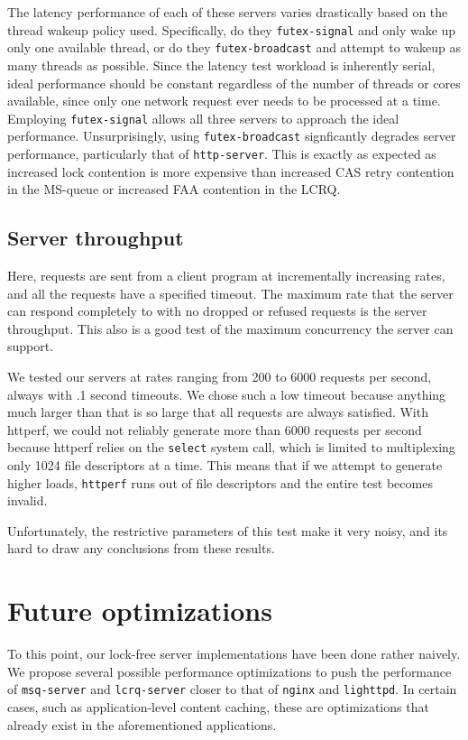 \documentclass[twoside,10pt]{article}
\begin{document}
\begin{multicols}{2}
The latency performance of each of these servers varies drastically based on
the thread wakeup policy used. Specifically, do they \verb+futex-signal+ and 
only wake up only one available thread, or do they \verb+futex-broadcast+ and attempt to wakeup as many threads as possible. Since the latency test workload
is inherently serial, ideal performance should be constant regardless of the 
number of threads or cores available, since only one network request ever needs
to be processed at a time. Employing \verb+futex-signal+ allows all three 
servers to approach the ideal performance. Unsurprisingly, using \verb+futex-broadcast+ signficantly degrades server performance, particularly that of 
\verb+http-server+. This is exactly as expected as increased lock contention 
is more expensive than increased CAS retry contention in the MS-queue or increased FAA contention in the LCRQ. 


\subsection{Server throughput}

Here, requests are sent from a client program at incrementally
increasing rates, and all the requests have a specified
timeout. The maximum rate that the server can respond completely to
with no dropped or refused requests is the server throughput. This
also is a good test of the maximum concurrency the server can support.

We tested our servers at rates ranging from 200 to 6000 requests per second, 
always with .1 second timeouts. We chose such a low timeout because anything 
much larger than that is so large that all requests are always satisfied. With httperf, we could not reliably generate more than 6000 requests per second 
because httperf relies on the \verb+select+ system call, which is limited to
multiplexing only 1024 file descriptors at a time. This means that if we 
attempt to generate higher loads, \verb+httperf+ runs out of file descriptors 
and the entire test becomes invalid. 

Unfortunately, the restrictive parameters of this test make it very noisy, 
and its hard to draw any conclusions from these results. 

\section{Future optimizations}

To this point, our lock-free server implementations have been done
rather naively. We propose several possible performance optimizations
to push the performance of \verb+msq-server+ and \verb+lcrq-server+
closer to that of \verb+nginx+ and \verb+lighttpd+. In certain cases,
such as application-level content caching, these are optimizations
that already exist in the aforementioned applications.


\end{multicols}
\end{document}
